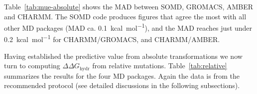 \documentclass[journal=jctcce,manuscript=article]{achemso}
\begin{document}
Table~\ref{tab:mue-absolute} shows the MAD between SOMD, GROMACS, AMBER and 
CHARMM. The SOMD code produces figures that agree the most with all other MD packages (MAD ca.  \SI{0.1}{kcal.mol^{-1}}), and the MAD reaches just under 
\SI{0.2}{kcal.mol^{-1}} for CHARMM/GROMACS, and CHARMM/AMBER.

\begin{table}[]
  \begin{minipage}{\linewidth}
    \caption{Mean Absolute Deviations (MAD) (\SI{}{kcal.mol^{-1}}) between relative free energies obtained with the absolute protocol for the SOMD, GROMACS, AMBER and CHARMM packages.}\label{tab:mue-absolute}
  \end{minipage}
\end{table}

Having established the predictive value from absolute transformations we now turn to computing $\Delta\Delta G_{\mathrm{hydr}}$ from relative mutations.  
Table~\ref{tab:relative} summarizes the results for the four MD packages.  
Again the data is from the recommended protocol (see detailed discussions in 
the following subsections).
\end{document}
